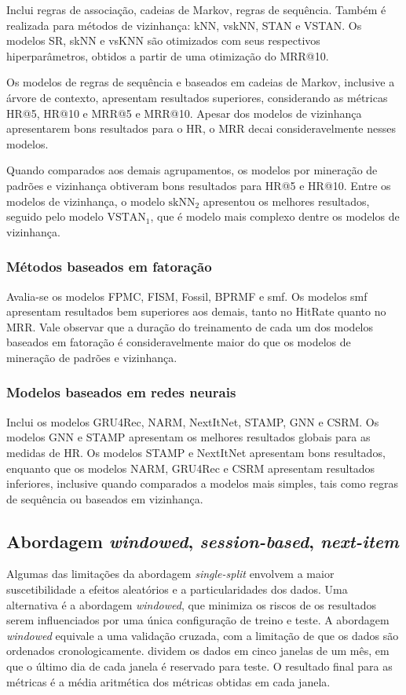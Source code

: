 Inclui regras de associação, cadeias de Markov, regras de
sequência. Também é realizada para métodos de vizinhança: kNN, vskNN, STAN e
VSTAN. Os modelos SR, skNN e vsKNN são otimizados com seus respectivos
hiperparâmetros, obtidos a partir de uma otimização do MRR@10.

Os modelos de regras de sequência e baseados em cadeias de Markov, inclusive a
árvore de contexto, apresentam resultados superiores, considerando as métricas
HR@5, HR@10 e MRR@5 e MRR@10. Apesar dos modelos de vizinhança apresentarem
bons resultados para o HR, o MRR decai consideravelmente nesses modelos.

Quando comparados aos demais agrupamentos, os modelos por mineração de padrões e
vizinhança obtiveram bons resultados para HR@5 e HR@10. Entre os modelos de
vizinhança, o modelo $\text{skNN}_2$ apresentou os melhores resultados, seguido pelo
modelo $\text{VSTAN}_1$, que é modelo mais complexo dentre os modelos de vizinhança.

\subsubsection{Métodos baseados em fatoração}
Avalia-se os modelos FPMC, FISM, Fossil,
BPRMF e smf. Os modelos smf apresentam resultados bem superiores aos demais, tanto no HitRate
quanto no MRR. Vale observar que a duração do treinamento de cada um dos modelos
baseados em fatoração é consideravelmente maior do que os modelos de mineração
de padrões e vizinhança.

\subsubsection{Modelos baseados em redes neurais}
Inclui os modelos GRU4Rec, NARM, NextItNet, STAMP, GNN e CSRM. Os modelos GNN e
STAMP apresentam os melhores resultados globais para as medidas de HR. Os
modelos STAMP e NextItNet apresentam bons resultados, enquanto que os modelos
NARM, GRU4Rec e CSRM apresentam resultados inferiores, inclusive quando comparados
a modelos mais simples, tais como regras de sequência ou baseados em vizinhança.


\subsection{Abordagem \textit{windowed}, \textit{session-based}, \textit{next-item}}
Algumas das limitações da abordagem \textit{single-split} envolvem a maior
suscetibilidade a efeitos aleatórios e a particularidades dos dados. Uma
alternativa é a abordagem \textit{windowed}, que minimiza os riscos de os
resultados serem influenciados por uma única configuração de treino e teste. A
abordagem \textit{windowed} equivale a uma validação cruzada, com a limitação de
que os dados são ordenados cronologicamente. \citet{ludewig_2018} dividem os
dados em cinco janelas de um mês, em que o último dia de cada janela é reservado
para teste. O resultado final para as métricas é a média aritmética dos
métricas obtidas em cada janela.


